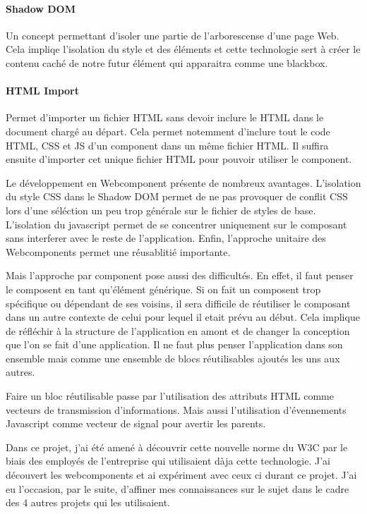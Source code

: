 \paragraph{Shadow DOM} Un concept permettant d'isoler une partie de l'arborescense d'une page Web.
Cela impliqe l'isolation du style et des éléments et cette technologie sert à créer le contenu caché de notre futur élément qui apparaitra comme une blackbox.

\paragraph{HTML Import} Permet d'importer un fichier HTML sans devoir inclure le HTML dans le document chargé au départ.
Cela permet notemment d'inclure tout le code HTML, CSS et JS d'un component dans un même fichier HTML.
Il suffira ensuite d'importer cet unique fichier HTML pour pouvoir utiliser le component.

\bigskip

Le développement en Webcomponent présente de nombreux avantages.
L'isolation du style CSS dans le Shadow DOM permet de ne pas provoquer de conflit CSS lors d'une séléction un peu trop générale sur le fichier de styles de base.
L'isolation du javascript permet de se concentrer uniquement sur le composant sans interferer avec le reste de l'application.
Enfin, l'approche unitaire des Webcomponents permet une réusablitié importante.

Mais l'approche par component pose aussi des difficultés.
En effet, il faut penser le composent en tant qu'élément générique.
Si on fait un composent trop spécifique ou dépendant de ses voisins, il sera difficile de réutiliser le composant dans un autre contexte de celui pour lequel il etait prévu au début.
Cela implique de réfléchir à la structure de l'application en amont et de changer la conception que l'on se fait d'une application.
Il ne faut plus penser l'application dans son ensemble mais comme une ensemble de blocs réutilisables ajoutés les uns aux autres.

Faire un bloc réutilisable passe par l'utilisation des attributs HTML comme vecteurs de transmission d'informations.
Mais aussi l'utilisation d'évennements Javascript comme vecteur de signal pour avertir les parents.

\bigskip

Dans ce projet, j'ai été amené à découvrir cette nouvelle norme du W3C par le biais des employés de l'entreprise qui utilisaient dàja cette technologie.
J'ai découvert les webcomponents et ai expériment avec ceux ci durant ce projet.
J'ai eu l'occasion, par le suite, d'affiner mes connaissances sur le sujet dans le cadre des 4 autres projets qui les utilisaient.